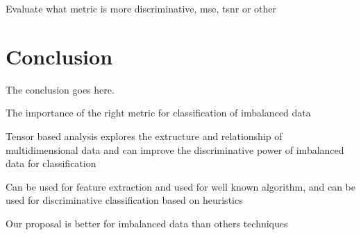 Evaluate what metric is more discriminative, mse, tsnr or other

\section{Conclusion}

The conclusion goes here.

The importance of the right metric for classification of imbalanced data

Tensor based analysis explores the extructure and relationship of multidimensional data and can improve the discriminative power of imbalanced data for classification

Can be used for feature extraction and used for well known algorithm,  and can be used for discriminative classification based on heuristics

Our proposal is better for imbalanced data than others techniques